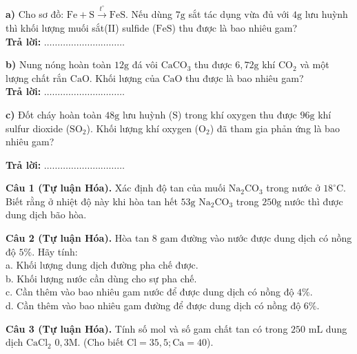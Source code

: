 \documentclass{article}
\begin{document}
\fontsize{26}{34}\selectfont
\textbf{a)} Cho sơ đồ: $\text{Fe} + \text{S} \xrightarrow{t^\circ} \text{FeS}$. Nếu dùng $7\text{g}$ sắt tác dụng vừa đủ với $4\text{g}$ lưu huỳnh thì khối lượng muối sắt(II) sulfide ($\text{FeS}$) thu được là bao nhiêu gam?\\
\textbf{Trả lời:} $\dots\dots\dots\dots\dots\dots\dots\dots\dots\dots$

\vspace*{\fill}

\textbf{b)} Nung nóng hoàn toàn $12\text{g}$ đá vôi $\text{CaCO}_3$ thu được $6,72\text{g}$ khí $\text{CO}_2$ và một lượng chất rắn $\text{CaO}$. Khối lượng của $\text{CaO}$ thu được là bao nhiêu gam?\\
\textbf{Trả lời:} $\dots\dots\dots\dots\dots\dots\dots\dots\dots\dots$
\vspace*{\fill}
\newpage

\fontsize{26}{34}\selectfont
\textbf{c)} Đốt cháy hoàn toàn $48\text{g}$ lưu huỳnh ($\text{S}$) trong khí oxygen thu được $96\text{g}$ khí sulfur dioxide ($\text{SO}_2$). Khối lượng khí oxygen ($\text{O}_2$) đã tham gia phản ứng là bao nhiêu gam?
\vspace{16pt}

\textbf{Trả lời:} $\dots\dots\dots\dots\dots\dots\dots\dots\dots\dots$
\vspace*{\fill}
\newpage

\fontsize{26}{34}\selectfont
\textbf{Câu 1 (Tự luận Hóa).} Xác định độ tan của muối $\text{Na}_2\text{CO}_3$ trong nước ở $18^\circ\text{C}$. Biết rằng ở nhiệt độ này khi hòa tan hết $53\text{g } \text{Na}_2\text{CO}_3$ trong $250\text{g}$ nước thì được dung dịch bão hòa.
\vspace*{\fill}
\newpage

\fontsize{25}{33}\selectfont
\textbf{Câu 2 (Tự luận Hóa).} Hòa tan $8\text{ gam}$ đường vào nước được dung dịch có nồng độ $5\%$. Hãy tính:\\
a. Khối lượng dung dịch đường pha chế được.\\
b. Khối lượng nước cần dùng cho sự pha chế.\\
c. Cần thêm vào bao nhiêu gam nước để được dung dịch có nồng độ $4\%$.\\
d. Cần thêm vào bao nhiêu gam đường để được dung dịch có nồng độ $6\%$.
\vspace*{\fill}
\newpage

\fontsize{26}{34}\selectfont
\textbf{Câu 3 (Tự luận Hóa).} Tính số mol và số gam chất tan có trong $250\text{ mL}$ dung dịch $\text{CaCl}_2$ $0,3\text{M}$. (Cho biết $\text{Cl} = 35,5; \text{Ca} = 40$).
\vspace*{\fill}
\newpage
\end{document}
